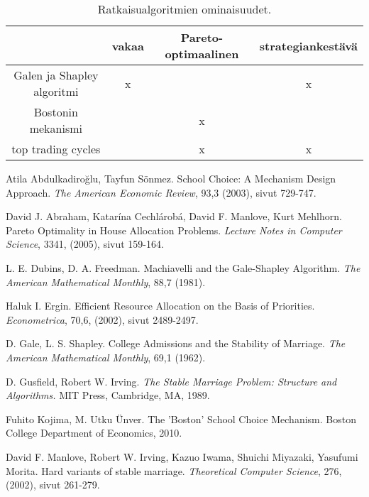 \documentclass[twoside]{tktltiki}
\begin{document}
\begin{table}[]
  \begin{center}
    \begin{tabular}{ c | c c c }
      & vakaa & Pareto-optimaalinen & strategiankestävä \\
      \hline
      Galen ja Shapley algoritmi & x & & x \\
      Bostonin mekanismi & & x & \\
      top trading cycles & & x & x \\
    \end{tabular}
    \caption{Ratkaisualgoritmien ominaisuudet.}
    \label{algoritmi_ominaisuudet}
  \end{center}
\end{table}

\begin{thebibliography}{XXX99}

  Atila Abdulkadiroğlu, Tayfun Sönmez.
  School Choice: A Mechanism Design Approach.
  \emph{The American Economic Review}, 93,3 (2003), sivut 729-747.

  David J. Abraham, Katarína Cechlárobá, David F. Manlove, Kurt
  Mehlhorn.
  Pareto Optimality in House Allocation Problems.
  \emph{Lecture Notes in Computer Science}, 3341, (2005), sivut 159-164.

  L. E. Dubins, D. A. Freedman.
  Machiavelli and the Gale-Shapley Algorithm.
  \emph{The American Mathematical Monthly}, 88,7 (1981).

  Haluk I. Ergin.
  Efficient Resource Allocation on the Basis of Priorities.
  \emph{Econometrica}, 70,6, (2002), sivut 2489-2497.

  D. Gale, L. S. Shapley.
  College Admissions and the Stability of Marriage.
  \emph{The American Mathematical Monthly}, 69,1 (1962).

  D. Gusfield, Robert W. Irving.
  \emph{The Stable Marriage Problem: Structure and Algorithms.}
  MIT Press, Cambridge, MA, 1989.

  Fuhito Kojima, M. Utku Ünver.
  The 'Boston' School Choice Mechanism.
  Boston College Department of Economics, 2010.

  David F. Manlove, Robert W. Irving, Kazuo Iwama, Shuichi Miyazaki,
  Yasufumi Morita.
  Hard variants of stable marriage.
  \emph{Theoretical Computer Science}, 276, (2002), sivut 261-279.


\end{thebibliography}
\end{document}
